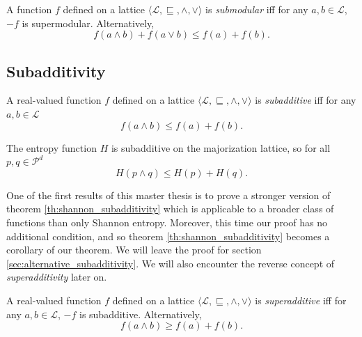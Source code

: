 \begin{definition} \label{def:submodularity}
    A function $f$ defined on a lattice $\langle \mathcal{L}, \sqsubseteq, \wedge, \vee \rangle$ is \textit{submodular} iff for any $a, b \in \mathcal{L}$, $-f$ is supermodular. Alternatively,
    \begin{equation}
        f(a \wedge b) + f(a \vee b) \leq f(a) + f(b).
    \end{equation}
\end{definition}



\subsection{Subadditivity} \label{sec:subadditivity}

\begin{definition}[Subadditivity] \label{def:subadditivity}
    A real-valued function $f$ defined on a lattice $\langle \mathcal{L}, \sqsubseteq, \wedge, \vee \rangle$ is \textit{subadditive} iff for any $a, b \in \mathcal{L}$
    \begin{equation}
        f(a \wedge b) \leq f(a) + f(b).
    \end{equation}
\end{definition}

\begin{theorem} \label{th:shannon_subadditivity}
    The entropy function $H$ is subadditive on the majorization lattice, so for all $p, q \in \mathcal{P}^d$
    \begin{equation}
        H(p \wedge q) \leq H(p) + H(q).
    \end{equation}
\end{theorem}

One of the first results of this master thesis is to prove a stronger version of theorem \ref{th:shannon_subadditivity} which is applicable to a broader class of functions than only Shannon entropy. Moreover, this time our proof has no additional condition, and so theorem \ref{th:shannon_subadditivity} becomes a corollary of our theorem. We will leave the proof for section \ref{sec:alternative_subadditivity}. We will also encounter the reverse concept of \textit{superadditivity} later on.

\begin{definition}[Superadditivity] \label{def:superadditivity}
    A real-valued function $f$ defined on a lattice $\langle \mathcal{L}, \sqsubseteq, \wedge, \vee \rangle$ is \textit{superadditive} iff for any $a, b \in \mathcal{L}$, $-f$ is subadditive. Alternatively,
    \begin{equation}
        f(a \wedge b) \geq f(a) + f(b).
    \end{equation}
\end{definition}



